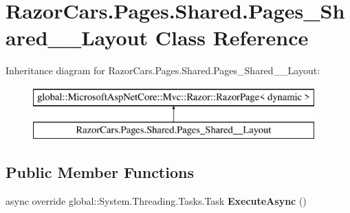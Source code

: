 \hypertarget{class_razor_cars_1_1_pages_1_1_shared_1_1_pages___shared_____layout}{}\section{Razor\+Cars.\+Pages.\+Shared.\+Pages\+\_\+\+Shared\+\_\+\+\_\+\+Layout Class Reference}
\label{class_razor_cars_1_1_pages_1_1_shared_1_1_pages___shared_____layout}
Inheritance diagram for Razor\+Cars.\+Pages.\+Shared.\+Pages\+\_\+\+Shared\+\_\+\+\_\+\+Layout\+:\begin{figure}[H]
\begin{center}
\leavevmode
\includegraphics[height=2.000000cm]{class_razor_cars_1_1_pages_1_1_shared_1_1_pages___shared_____layout}
\end{center}
\end{figure}
\subsection*{Public Member Functions}
\begin{DoxyCompactItemize}
\item 
\mbox{\label{class_razor_cars_1_1_pages_1_1_shared_1_1_pages___shared_____layout_a5607a6d230e9baef98ee1a6d4751f616}} 
async override global\+::\+System.\+Threading.\+Tasks.\+Task {\bfseries Execute\+Async} ()
\end{DoxyCompactItemize}
